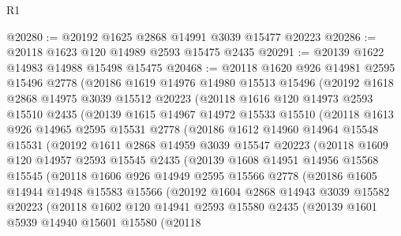 \begin{lexlean}{R1}
\begin{coremodule}
@20280 := @20192 @1625 @2868 @14991 @3039 @15477 @20223
@20286 := @20118 @1623 @120 @14989 @2593 @15475 @2435
@20291 := @20139 @1622 @14983 @14988 @15498 @15475
@20468 := @20118
    @1620
    @926
    @14981
    @2595
    @15496
    @2778
    (@20186
      @1619
      @14976
      @14980
      @15513
      @15496
      (@20192
        @1618
        @2868
        @14975
        @3039
        @15512
        @20223
        (@20118
          @1616
          @120
          @14973
          @2593
          @15510
          @2435
          (@20139
            @1615
            @14967
            @14972
            @15533
            @15510
            (@20118
              @1613
              @926
              @14965
              @2595
              @15531
              @2778
              (@20186
                @1612
                @14960
                @14964
                @15548
                @15531
                (@20192
                  @1611
                  @2868
                  @14959
                  @3039
                  @15547
                  @20223
                  (@20118
                    @1609
                    @120
                    @14957
                    @2593
                    @15545
                    @2435
                    (@20139
                      @1608
                      @14951
                      @14956
                      @15568
                      @15545
                      (@20118
                        @1606
                        @926
                        @14949
                        @2595
                        @15566
                        @2778
                        (@20186
                          @1605
                          @14944
                          @14948
                          @15583
                          @15566
                          (@20192
                            @1604
                            @2868
                            @14943
                            @3039
                            @15582
                            @20223
                            (@20118
                              @1602
                              @120
                              @14941
                              @2593
                              @15580
                              @2435
                              (@20139
                                @1601
                                @5939
                                @14940
                                @15601
                                @15580
                                (@20118

\end{coremodule}
\end{lexlean}

